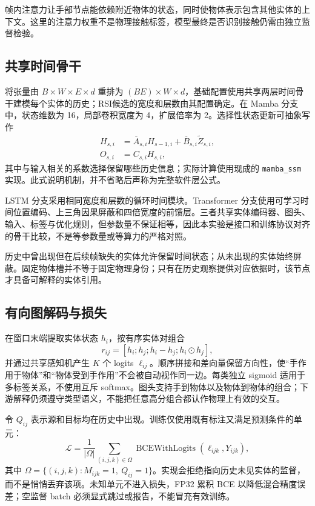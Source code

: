 \documentclass[10pt,twocolumn,letterpaper]{article}
\newcommand{\code}[1]{\texttt{\small #1}}
\begin{document}
帧内注意力让手部节点能依赖附近物体的状态，同时使物体表示包含其他实体的上下文。这里的注意力权重不是物理接触标签，模型最终是否识别接触仍需由独立监督检验。

\subsection{共享时间骨干}
将张量由 $B\times W\times E\times d$ 重排为 $(BE)\times W\times d$，基础配置使用共享两层时间骨干建模每个实体的历史；RSI候选的宽度和层数由其配置确定。在 Mamba 分支中，状态维数为 16，局部卷积宽度为 4，扩展倍率为 2。选择性状态更新可抽象写作
\begin{align}
 H_{s,i}&=\overline A_{s,i}H_{s-1,i}
             +\overline B_{s,i}\widetilde Z_{s,i},\\
 O_{s,i}&=C_{s,i}H_{s,i},
\end{align}
其中与输入相关的系数选择保留哪些历史信息；实际计算使用现成的 \code{mamba\_ssm} 实现。此式说明机制，并不省略后声称为完整软件层公式。

LSTM 分支采用相同宽度和层数的循环时间模块。Transformer 分支使用可学习时间位置编码、上三角因果屏蔽和四倍宽度的前馈层。三者共享实体编码器、图头、输入、标签与优化规则，但参数量不保证相等，因此本实验是接口和训练协议对齐的骨干比较，不是等参数量或等算力的严格对照。

历史中曾出现但在后续帧缺失的实体允许保留时间状态；从未出现的实体始终屏蔽。固定物体槽并不等于固定物理身份；只有在历史观察提供对应依据时，该节点才具备可解释的实体引用。

\subsection{有向图解码与损失}
在窗口末端提取实体状态 $h_i$，按有序实体对组合
\begin{equation}
 r_{ij}=[h_i;h_j;h_i-h_j;h_i\odot h_j],
\end{equation}
并通过共享感知机产生 $K$ 个 logits $\ell_{ij}$。顺序拼接和差向量保留方向性，使“手作用于物体”和“物体受到手作用”不会被自动视作同一边。每类独立 sigmoid 适用于多标签关系，不使用互斥 softmax。图头支持手到物体以及物体到物体的组合；下游解释仍须遵守类型语义，不能把任意高分组合都认作物理上有效的交互。

令 $Q_{ij}$ 表示源和目标均在历史中出现。训练仅使用既有标注又满足预测条件的单元：
\begin{equation}
 \mathcal L=\frac{1}{|\Omega|}
 \sum_{(i,j,k)\in\Omega}
 \operatorname{BCEWithLogits}(\ell_{ijk},Y_{ijk}),
\end{equation}
其中 $\Omega=\{(i,j,k):M_{ijk}=1,\ Q_{ij}=1\}$。实现会拒绝指向历史未见实体的监督，而不是悄悄丢弃该项。未知单元不进入损失，FP32 累积 BCE 以降低混合精度误差；空监督 batch 必须显式跳过或报告，不能冒充有效训练。
\end{document}
